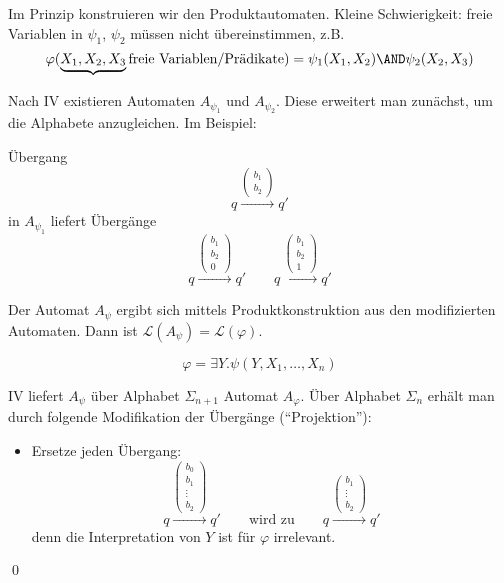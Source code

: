 \begin{description}[style=nextline]
\begin{description}[style=nextline]
    \item[$\varphi = \psi_1 \AND \psi_2$]
    Im Prinzip konstruieren wir den Produktautomaten. Kleine
    Schwierigkeit: freie Variablen in $\psi_1$, $\psi_2$ müssen nicht
    übereinstimmen, z.B.
    \[
      \varphi(\underbrace{X_1,X_2,X_3}{\text{freie Variablen/Prädikate}}) = \psi_1(X_1,X_2) \AND \psi_2(X_2,X_3)
    \]
  \end{description}
  
  Nach IV existieren Automaten $A_{\psi_1}$ und $A_{\psi_2}$. Diese
  erweitert man zunächst, um die Alphabete anzugleichen. Im Beispiel:
  
  Übergang
  \[
    q \xrightarrow{\begin{pmatrix}b_1\\b_2\end{pmatrix}} q' 
  \]
  in $A_{\psi_1}$ liefert Übergänge
  \[
    q \xrightarrow{\begin{pmatrix}b_1\\b_2\\0\end{pmatrix}} q' \qquad
    q \xrightarrow{\begin{pmatrix}b_1\\b_2\\1\end{pmatrix}} q'
  \]
  
  Der Automat $A_\psi$ ergibt sich mittels Produktkonstruktion aus den
  modifizierten Automaten. Dann ist $\mathcal{L}(A_\psi)=\mathcal{L}(\varphi)$.
\end{description}

\[
  \varphi = \exists Y.\psi(Y, X_1, \dots, X_n)
\]

IV liefert $A_\psi$ über Alphabet $\Sigma_{n+1}$ Automat $A_\varphi$.
Über Alphabet $\Sigma_n$ erhält man durch folgende Modifikation der
Übergänge (\enquote{Projektion}):

\begin{itemize}
  \item Ersetze jeden Übergang:
  \[
    q \xrightarrow{\begin{pmatrix}b_0\\b_1\\\vdots\\b_2\end{pmatrix}} q' 
    \qquad \text{wird zu} \qquad
    q \xrightarrow{\begin{pmatrix}b_1\\\vdots\\b_2\end{pmatrix}} q' 
  \]
  denn die Interpretation von $Y$ ist für $\varphi$ irrelevant.
\end{itemize}
\qed
